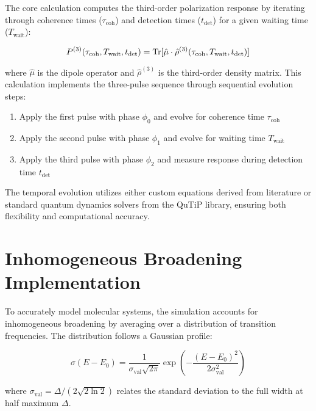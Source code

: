 \noindent
The core calculation computes the third-order polarization response by iterating through coherence times ($\tau_{\text{coh}}$) and detection times ($t_{\text{det}}$) for a given waiting time ($T_{\text{wait}}$):

\begin{equation}
	\label{eq:polarization_third_order}
	P^{(3)}(\tau_{\text{coh}}, T_{\text{wait}}, t_{\text{det}}) = \mathrm{Tr}[\hat{\mu} \cdot \hat{\rho}^{(3)}(\tau_{\text{coh}}, T_{\text{wait}}, t_{\text{det}})]
\end{equation}

\noindent
where $\hat{\mu}$ is the dipole operator and $\hat{\rho}^{(3)}$ is the third-order density matrix. This calculation implements the three-pulse sequence through sequential evolution steps:

\begin{enumerate}
	\item Apply the first pulse with phase $\phi_0$ and evolve for coherence time $\tau_{\text{coh}}$
	\item Apply the second pulse with phase $\phi_1$ and evolve for waiting time $T_{\text{wait}}$
	\item Apply the third pulse with phase $\phi_2$ and measure response during detection time $t_{\text{det}}$
\end{enumerate}

\noindent
The temporal evolution utilizes either custom equations derived from literature or standard quantum dynamics solvers from the QuTiP library, ensuring both flexibility and computational accuracy.

\section{Inhomogeneous Broadening Implementation}
\label{sec:inhomogeneous_broadening}

\noindent
To accurately model molecular systems, the simulation accounts for inhomogeneous broadening by averaging over a distribution of transition frequencies. The distribution follows a Gaussian profile:

\begin{equation}
	\label{eq:gaussian_distribution}
	\sigma(E - E_0) = \frac{1}{\sigma_{\text{val}}\sqrt{2\pi}} \exp\left(-\frac{(E-E_0)^2}{2\sigma_{\text{val}}^2}\right)
\end{equation}

\noindent
where $\sigma_{\text{val}} = \Delta/(2\sqrt{2\ln{2}})$ relates the standard deviation to the full width at half maximum $\Delta$.

